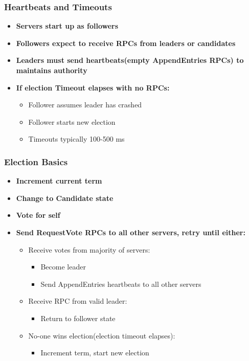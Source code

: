 \begin{frame}
    \frametitle{Heartbeats and Timeouts}
    \begin{itemize}
        \item \textbf{Servers start up as followers}
        \item \textbf{Followers expect to receive RPCs from leaders or candidates}
        \item \textbf{Leaders must send \alert{heartbeats}(empty AppendEntries RPCs) to maintains authority}
        \item \textbf{If \alert{election Timeout} elapses with no RPCs:}
            \begin{itemize}
                \item Follower assumes leader has crashed
                \item Follower starts new election
                \item Timeouts typically 100-500 ms
            \end{itemize}
    \end{itemize}
\end{frame}

\begin{frame}
    \frametitle{Election Basics}
    \begin{itemize}
        \item \textbf{Increment current term}
        \item \textbf{Change to Candidate state}
    \item \textbf{Vote for self}
    \item \textbf{Send RequestVote RPCs to all other servers, retry until either:}
            \begin{itemize}
                \item Receive votes from majority of servers:
                    \begin{itemize}
                        \item Become leader
                        \item Send AppendEntries heartbeats to all other servers
                    \end{itemize}
                \item Receive RPC from valid leader:
                    \begin{itemize}
                        \item Return to follower state
                    \end{itemize}
                \item No-one wins election(election timeout elapses):
                    \begin{itemize}
                        \item Increment term, start new election
                    \end{itemize}
            \end{itemize}
    \end{itemize}
\end{frame}

